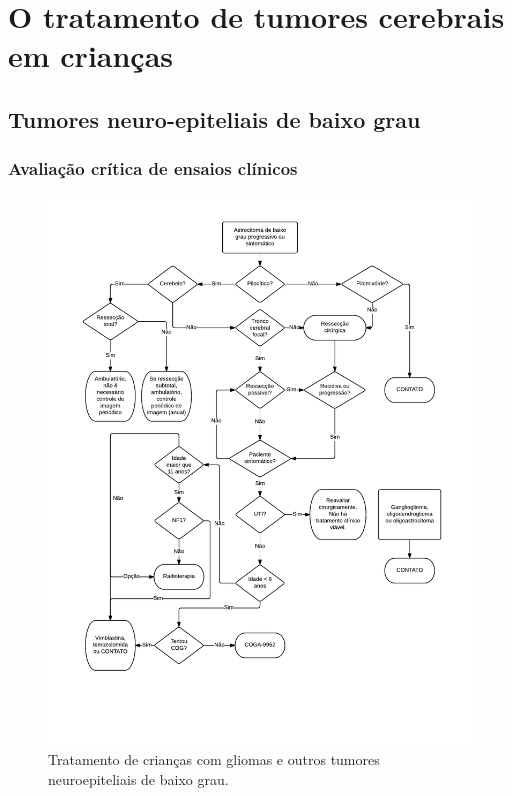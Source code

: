 \documentclass[11pt,a4paper,oldfontcommands]{memoir}
\begin{document}
\chapter{O tratamento de tumores cerebrais em crianças}

\section{Tumores neuro-epiteliais de baixo grau}

\subsection{Avaliação crítica de ensaios clínicos}
\begin{figure}[!htb]
\includegraphics[scale=0.87,trim = 18mm 30mm 15mm 12mm,clip]{fig/fig3.pdf}
\caption{Tratamento de crianças com gliomas e outros tumores neuroepiteliais de baixo grau.}
\end{figure}
\end{document}
